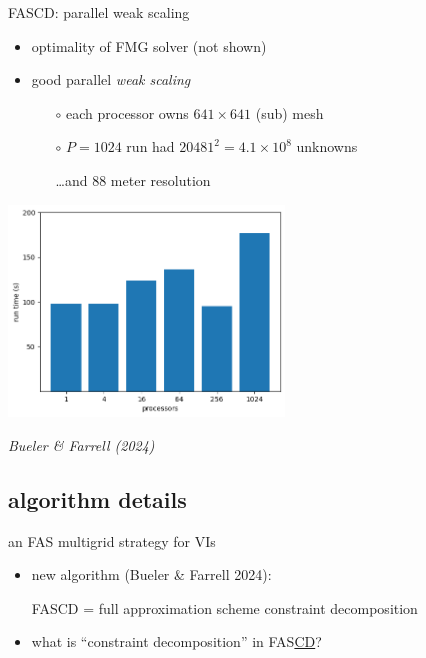 \documentclass[svgnames,
               hyperref={colorlinks,citecolor=DeepPink4,linkcolor=FireBrick,urlcolor=Maroon},
               usepdftitle=false]  %
               {beamer}
\begin{document}
\begin{frame}{FASCD: parallel weak scaling}

\begin{itemize}
\item optimality of FMG solver (not shown)
\item good parallel \emph{weak scaling}
    \begin{itemize}
    \item[$\circ$] each processor owns $641\times 641$ (sub) mesh
    \item[$\circ$] $P=1024$ run had $20481^2=4.1\times 10^8$ unknowns
    \item[] \dots and 88 meter resolution
    \end{itemize}
\end{itemize}

\bigskip
\centering
\includegraphics[width=0.55\textwidth]{../talk-dms/figs/siaweaktime.png}

\hfill \scriptsize
\emph{Bueler \& Farrell (2024)}
\end{frame}


\subsection{algorithm details}

\begin{frame}{an FAS multigrid strategy for VIs}

\begin{itemize}
\item new algorithm (Bueler \& Farrell 2024):

{\color{FireBrick} FASCD = full approximation scheme constraint decomposition}

\bigskip
\item what is ``constraint decomposition'' in FAS\underline{CD}?
\end{itemize}
\end{frame}
\end{document}
